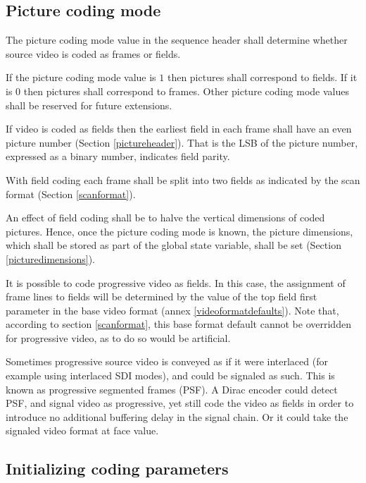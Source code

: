 \subsection{Picture coding mode}
\label{picturecodingmode}

The picture coding mode value in the sequence header shall determine 
whether source video is coded as frames or fields. 

If the picture coding mode value is $1$ then pictures shall correspond to fields. 
If it is $0$ then pictures shall correspond to frames. Other picture coding mode 
values shall be reserved for future extensions.

If video is coded as fields then the earliest field in each frame shall have 
an even picture number (Section \ref{pictureheader}). That is the LSB of the 
picture number, expressed as a binary number, indicates field parity.

With field coding each frame shall be split into two fields as indicated 
by the scan format (Section \ref{scanformat}).

An effect of field coding shall be to halve the vertical dimensions of 
coded pictures. Hence, once the picture coding mode is known, the 
picture dimensions, which shall be stored as part of the global 
state variable, shall be set (Section \ref{picturedimensions}).

\begin{informative}
It is possible to code progressive video as fields. In this case, 
the assignment of frame lines to fields will be determined by the 
value of the top field first parameter in the base video format 
(annex \ref{videoformatdefaults}). Note that, according to 
section \ref{scanformat}, this base format default cannot be overridden 
for progressive video, as to do so would be artificial.

Sometimes progressive source video is conveyed as if it were interlaced
(for example using interlaced SDI modes), and could be signaled as such.
This is known as progressive segmented frames (PSF). A Dirac encoder could
detect PSF, and signal video as progressive, yet still code the video as 
fields in order to introduce no additional buffering delay in the signal
chain. Or it could take the signaled video format at face value.
\end{informative}

\subsection{Initializing coding parameters}
\label{codingparameters}

